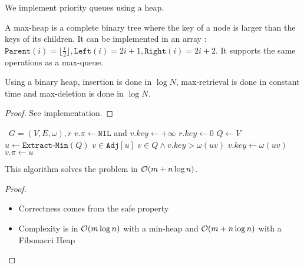 \documentclass{cours}
\begin{document}
        We implement priority queues using a heap.
        \begin{definition}
            A max-heap is a complete binary tree where the key of a node is larger than the keys of its children. It can be implemented in an array : $\texttt{Parent}(i) = \lfloor \frac{i}{2}\rfloor, \texttt{Left}(i) = 2 i + 1, \texttt{Right}(i) = 2i + 2$. It supports the same operations as a max-queue.
        \end{definition}

        \begin{theorem}
            Using a binary heap, insertion is done in $\log N$, max-retrieval is done in constant time and max-deletion is done in $\log N$.
        \end{theorem}
        \begin{proof}
            See implementation.
        \end{proof}

        \begin{algorithm}
            \begin{algorithmic}
                \Input \ $G = \left(V, E, \omega\right), r$
                \EndInput
                    \State $v.\pi \gets \texttt{NIL}$ and $v.key \gets + \infty$
                \EndFor
                \State $r.key \gets 0$
                \State $Q \gets V$
                    \State $u \gets \texttt{Extract-Min}(Q)$
                    \For $v \in \texttt{Adj}[u]$ 
                        \If $v \in Q \wedge v.key > \omega(uv)$
                            \State $v.key \gets \omega(uv)$
                            \State $v.\pi \gets u$
                        \EndIf
                    \EndFor
                \EndWhile
            \end{algorithmic}
        \end{algorithm}

        \begin{theorem}
            This algorithm solves the problem in $\mathcal{O}(m + n\log n)$.
        \end{theorem}

        \begin{proof}
            \begin{itemize}
                \item Correctness comes from the safe property
                \item Complexity is in $\mathcal{O}(m\log n)$ with a min-heap and $\mathcal{O}(m + n\log n)$ with a Fibonacci Heap
            \end{itemize}
        \end{proof}
\end{document}
